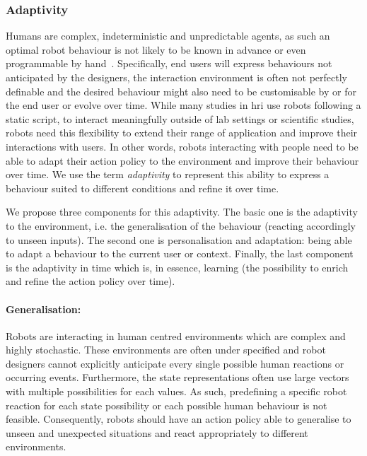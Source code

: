 \subsubsection{Adaptivity}	\label{ssec:adap}
    Humans are complex, indeterministic and unpredictable agents, as such an optimal robot behaviour is not likely to be known in advance or even programmable by hand~\citep{dautenhahn2004robots,argall2009survey}. Specifically, end users will express behaviours not anticipated by the designers, the interaction environment is often not perfectly definable and the desired behaviour might also need to be customisable by or for the end user or evolve over time. While many studies in \gls{hri} use robots following a static script, to interact meaningfully outside of lab settings or scientific studies, robots need this flexibility to extend their range of application and improve their interactions with users. In other words, robots interacting with people need to be able to adapt their action policy to the environment and improve their behaviour over time. We use the term \emph{adaptivity} to represent this ability to express a behaviour suited to different conditions and refine it over time. 
    
    We propose three components for this adaptivity. The basic one is the adaptivity to the environment, i.e. the generalisation of the behaviour (reacting accordingly to unseen inputs). The second one is personalisation and adaptation: being able to adapt a behaviour to the current user or context. Finally, the last component is the adaptivity in time which is, in essence, learning (the possibility to enrich and refine the action policy over time). 
       
    \paragraph{Generalisation:} Robots are interacting in human centred environments which are complex and highly stochastic. These environments are often under specified and robot designers cannot explicitly anticipate every single possible human reactions or occurring events. Furthermore, the state representations often use large vectors with multiple possibilities for each values. As such, predefining a specific robot reaction for each state possibility or each possible human behaviour is not feasible. Consequently, robots should have an action policy able to generalise to unseen and unexpected situations and react appropriately to different environments.
    
